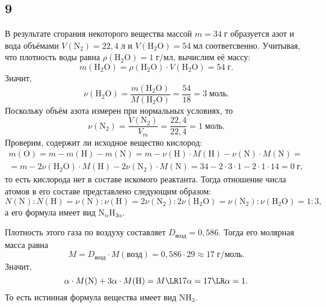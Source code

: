 \subsection{9}

В результате сгорания некоторого вещества массой $m=34\;\text{г}$ образуется азот и вода объёмами $V(\mathrm{N_2})=22{,}4\;\text{л}$ и $V(\mathrm{H_2O})=54\;\text{мл}$ соответсвенно. Учитывая, что плотность воды равна $\rho(\mathrm{H_2O})=1\;\text{г/мл}$, вычислим её массу:
\[
m(\mathrm{H_2O})=\rho(\mathrm{H_2O})\cdot V(\mathrm{H_2O})=54\;\text{г}.
\]
Значит,
\[
\nu(\mathrm{H_2O})=\frac{m(\mathrm{H_2O})}{M(\mathrm{H_2O})}=\frac{54}{18}=3\;\text{моль}.
\]
Поскольку объём азота измерен при нормальных условиях, то
\[
\nu(\mathrm{N_2})=\frac{V(\mathrm{N_2})}{V_m}=\frac{22{,}4}{22{,}4}=1\;\text{моль}.
\]
Проверим, содержит ли исходное вещество кислород:
\begin{multline*}
m(\mathrm{O})=m-m(\mathrm{H})-m(\mathrm{N})=m-\nu(\mathrm{H})\cdot M(\mathrm{H})-\nu(\mathrm{N})\cdot M(\mathrm{N})= \\
=m-2\nu(\mathrm{H_2O})\cdot M(\mathrm{H})-2\nu(\mathrm{N_2})\cdot M(\mathrm{N})=34-2\cdot3\cdot1-2\cdot1\cdot14=0\;\text{г},
\end{multline*}
то есть кислорода нет в составе искомого реактанта. Тогда отношение числа атомов в его составе представлено следующим образом:
\[
N(\mathrm{N}):N(\mathrm{H})=\nu(\mathrm{N}):\nu(\mathrm{H})=2\nu(\mathrm{N_2}):2\nu(\mathrm{H_2O})=\nu(\mathrm{N_2}):\nu(\mathrm{H_2O})=1:3,
\]
а его формула имеет вид $\mathrm{N_\alpha H_{3\alpha}}$.

Плотность этого газа по воздуху составляет $D_\text{возд}=0{,}586$. Тогда его молярная масса равна
\[
M=D_\text{возд}\cdot M(\text{возд})=0{,}586\cdot29\approx17\;\text{г/моль}.
\]
Значит,
\[
\alpha\cdot M(\mathrm{N})+3\alpha\cdot M(\mathrm{H})=M\LR17\alpha=17\LR\alpha=1.
\]
То есть истинная формула вещества имеет вид $\mathrm{NH_3}$.